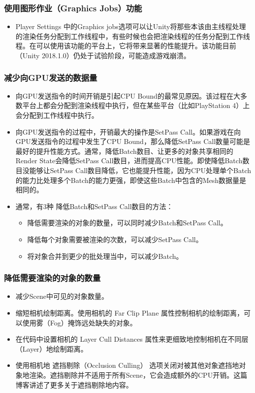 \documentclass[9pt, b5paper]{article}
\begin{document}
\subsubsection{使用图形作业（Graphics Jobs）功能}
\label{sec-6-3-1}
\begin{itemize}
\item Player Settings 中的Graphics jobs选项可以让Unity将那些本该由主线程处理的渲染任务分配到工作线程中，有些时候也会把渲染线程的任务分配到工作线程。在可以使用该功能的平台上，它将带来显著的性能提升。该功能目前（Unity 2018.1.0）仍处于试验阶段，可能造成游戏崩溃。
\end{itemize}
\subsubsection{减少向GPU发送的数据量}
\label{sec-6-3-2}
\begin{itemize}
\item 向GPU发送指令的时间开销是引起CPU Bound的最常见原因。该过程在大多数平台上都会分配到渲染线程中执行，但在某些平台（比如PlayStation 4）上会分配到工作线程中执行。
\item 向GPU发送指令的过程中，开销最大的操作是SetPass Call。如果游戏在向GPU发送指令的过程中发生了CPU Bound，那么降低SetPass Call数量可能是最好的提升性能方式。通常，降低Batch数目、让更多的对象共享相同的Render State会降低SetPass Call数目，进而提高CPU性能。即使降低Batch数目没能够让SetPass Call数目降低，它也能提升性能，因为CPU处理单个Batch的能力比处理多个Batch的能力更强，即使这些Batch中包含的Mesh数据量是相同的。
\item 通常，有3种 降低Batch和SetPass Call数目的方法：
\begin{itemize}
\item 降低需要渲染的对象的数量，可以同时减少Batch和SetPass Call。
\item 降低每个对象需要被渲染的次数，可以减少SetPass Call。
\item 将对象合并到更少的批处理当中，可以减少Batch。
\end{itemize}
\end{itemize}
\subsubsection{降低需要渲染的对象的数量}
\label{sec-6-3-3}
\begin{itemize}
\item 减少Scene中可见的对象数量。
\item 缩短相机绘制距离。使用相机的 Far Clip Plane 属性控制相机的绘制距离，可以使用雾（Fog）掩饰远处缺失的对象。
\item 在代码中设置相机的 Layer Cull Distances 属性来更细致地控制相机在不同层（Layer）地绘制距离。
\item 使用相机地 遮挡剔除（Occlusion Culling） 选项关闭对被其他对象遮挡地对象地渲染。遮挡剔除并不适用于所有Scene，它会造成额外的CPU开销。这篇博客讲述了更多关于遮挡剔除地内容。
\end{itemize}
\end{document}
